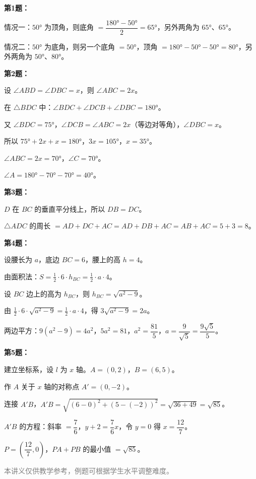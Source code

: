 \documentclass[12pt, a4paper]{ctexart}
\begin{document}
\vspace{10pt}

\begin{knowledgebox}[参考答案]

\textbf{第1题：}

情况一：$50°$ 为顶角，则底角 $= \dfrac{180° - 50°}{2} = 65°$，另外两角为 $65°$、$65°$。

情况二：$50°$ 为底角，则另一个底角 $= 50°$，顶角 $= 180° - 50° - 50° = 80°$，另外两角为 $50°$、$80°$。

\medskip
\textbf{第2题：}

设 $\angle ABD = \angle DBC = x$，则 $\angle ABC = 2x$。

在 $\triangle BDC$ 中：$\angle BDC + \angle DCB + \angle DBC = 180°$。

又 $\angle BDC = 75°$，$\angle DCB = \angle ABC = 2x$（等边对等角），$\angle DBC = x$。

所以 $75° + 2x + x = 180°$，$3x = 105°$，$x = 35°$。

$\angle ABC = 2x = 70°$，$\angle C = 70°$。

$\angle A = 180° - 70° - 70° = 40°$。

\medskip
\textbf{第3题：}

$D$ 在 $BC$ 的垂直平分线上，所以 $DB = DC$。

$\triangle ADC$ 的周长 $= AD + DC + AC = AD + DB + AC = AB + AC = 5 + 3 = 8$。

\medskip
\textbf{第4题：}

设腰长为 $a$，底边 $BC = 6$，腰上的高 $h = 4$。

由面积法：$S = \frac{1}{2} \cdot 6 \cdot h_{BC} = \frac{1}{2} \cdot a \cdot 4$。

设 $BC$ 边上的高为 $h_{BC}$，则 $h_{BC} = \sqrt{a^2 - 9}$。

由 $\frac{1}{2} \cdot 6 \cdot \sqrt{a^2 - 9} = \frac{1}{2} \cdot a \cdot 4$，得 $3\sqrt{a^2 - 9} = 2a$。

两边平方：$9(a^2 - 9) = 4a^2$，$5a^2 = 81$，$a^2 = \dfrac{81}{5}$，$a = \dfrac{9}{\sqrt{5}} = \dfrac{9\sqrt{5}}{5}$。

\medskip
\textbf{第5题：}

建立坐标系，设 $l$ 为 $x$ 轴。$A = (0, 2)$，$B = (6, 5)$。

作 $A$ 关于 $x$ 轴的对称点 $A' = (0, -2)$。

连接 $A'B$，$A'B = \sqrt{(6-0)^2 + (5-(-2))^2} = \sqrt{36 + 49} = \sqrt{85}$。

$A'B$ 的方程：斜率 $= \dfrac{7}{6}$，$y + 2 = \dfrac{7}{6}x$，令 $y = 0$ 得 $x = \dfrac{12}{7}$。

$P = \left(\dfrac{12}{7}, 0\right)$，$PA + PB$ 的最小值 $= \sqrt{85}$。

\end{knowledgebox}

\vfill
\begin{center}
\small\textcolor{gray}{本讲义仅供教学参考，例题可根据学生水平调整难度。}
\end{center}
\end{document}
